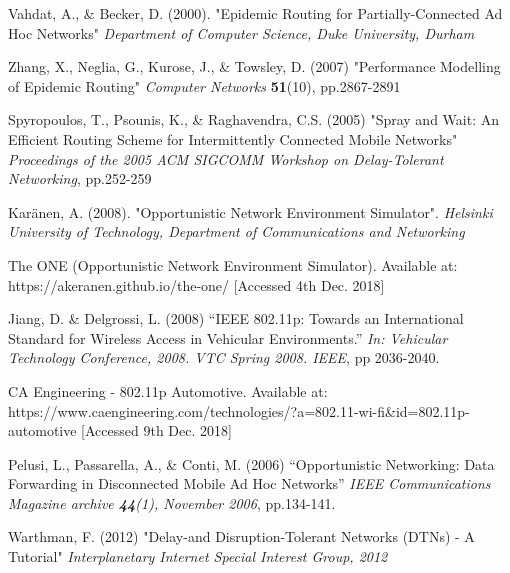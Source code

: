 \documentclass{article}
\begin{document}
\begin{thebibliography}{20}
Vahdat, A., \& Becker, D. (2000).
"Epidemic Routing for Partially-Connected Ad Hoc Networks"
\textit{Department of Computer Science, Duke University, Durham}

Zhang, X., Neglia, G., Kurose, J., \& Towsley, D. (2007)
"Performance Modelling of Epidemic Routing"
\textit{Computer Networks} \textbf{51}(10), pp.2867-2891

Spyropoulos, T., Psounis, K., \& Raghavendra, C.S. (2005)
"Spray and Wait: An Efficient Routing Scheme for
Intermittently Connected Mobile Networks"
\textit{Proceedings of the 2005 ACM SIGCOMM Workshop on Delay-Tolerant Networking}, pp.252-259

Karänen, A. (2008).
"Opportunistic Network Environment Simulator".
\textit{Helsinki University of Technology, Department of Communications and Networking}

The ONE (Opportunistic Network Environment Simulator). Available at: https://akeranen.github.io/the-one/ [Accessed 4th Dec. 2018]

Jiang, D. \& Delgrossi, L. (2008)
``IEEE 802.11p: Towards an International Standard for Wireless Access in Vehicular Environments.'' 
\textit{In: Vehicular Technology Conference, 2008. VTC Spring 2008. IEEE}, pp 2036-2040.

CA Engineering - 802.11p Automotive. Available at: https://www.caengineering.com/technologies/?a=802.11-wi-fi\&id=802.11p-automotive [Accessed 9th Dec. 2018]

Pelusi, L., Passarella, A., \& Conti, M. (2006)
``Opportunistic Networking: Data Forwarding in Disconnected Mobile Ad Hoc Networks''
\textit{IEEE Communications Magazine archive \textbf{44}(1), November 2006}, pp.134-141.

Warthman, F. (2012)
"Delay-and Disruption-Tolerant Networks (DTNs) - A Tutorial" \textit{Interplanetary Internet Special Interest Group, 2012}

\end{thebibliography}
 
\end{document}
